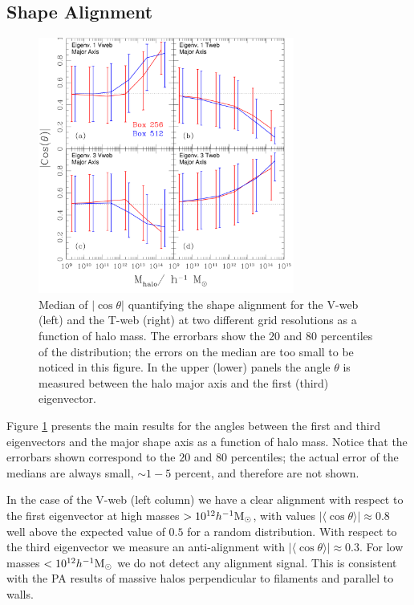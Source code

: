 \documentclass[useAMS,usenatbib]{mn2e}
\newcommand{\hMsun}{{\ifmmode{h^{-1}{\rm
        {M_{\odot}}}}\else{$h^{-1}{\rm{M_{\odot}}}$~}\fi}}
\newcommand{\muavg}{\vert\langle\cos\theta\rangle\vert}
\begin{document}
\subsection{Shape Alignment}

\begin{figure}
\includegraphics[width=0.75\textwidth]{Fig2.pdf}
\caption{Median of $|\cos\theta|$ quantifying the shape alignment for
  the V-web (left) and the T-web (right) at two different grid
  resolutions as a function of halo mass.  The errorbars show the $20$ and $80$ percentiles 
  of the distribution; the
  errors on the median are too small to be noticed in this figure. In the upper (lower) panels
  the angle $\theta$ is measured between the halo major axis and the first (third)
  eigenvector.\label{fig:shape_alignment} }
\end{figure}


Figure \ref{fig:shape_alignment} presents the main results for the
angles between the first and third eigenvectors and the major shape
axis as a function of halo mass.  Notice that the errorbars shown correspond
to the $20$ and $80$ percentiles; the actual error of the medians are
always small, $\sim 1-5$ percent, and therefore are not shown.  

In the case of the V-web (left column) we have a clear alignment with
respect to the first eigenvector at high masses $>10^{12}\hMsun$, with
values $\muavg\approx 0.8$ well above the expected value of $0.5$ for a
random distribution. With respect to the third eigenvector we measure
an anti-alignment with $\muavg\approx0.3$. For low masses
$<10^{12}\hMsun$ we do not detect any alignment signal. This is
consistent with the PA results of massive halos
perpendicular to filaments and parallel to walls.
\end{document}
